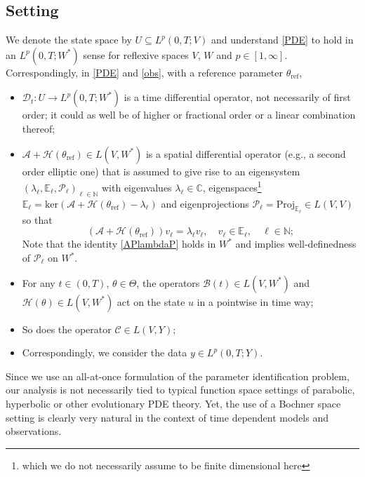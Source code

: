 \documentclass[12pt]{article}
\newcommand\DD{\mathcal{D}}
\newcommand\calA{\mathcal{A}}
\newcommand\BB{\mathcal{B}}
\newcommand\HH{\mathcal{H}}
\newcommand\Proj{\mathcal{P}}
\begin{document}
\subsection{Setting}\label{sec:setting}
We denote the state space by $U\subseteq L^p(0,T;V)$ and understand \eqref{PDE} to hold in an $L^p(0,T;W^*)$ sense for reflexive  spaces $V$, $W$ and $p\in[1,\infty]$.
Correspondingly, in \eqref{PDE} and \eqref{obs}, with a reference parameter $\theta_{\text{ref}}$,
\begin{itemize}
\item $\DD_t:U\to L^p(0,T;W^*)$ is a time differential operator, not necessarily of first order; it could as well be of higher or fractional order or a linear combination thereof; 
\item $\calA+\HH(\theta_{\text{ref}})\in L(V,W^*)$ is a spatial differential operator (e.g., a second order elliptic one) that is assumed to give rise to an eigensystem 
$(\lambda_\ell,\mathbb{E}_\ell,\Proj_\ell)_{\ell\in\mathbb{N}}$ with eigenvalues $\lambda_\ell\in\mathbb{C}$, 
eigenspaces\footnote{which we do not necessarily assume to be finite dimensional here} $\mathbb{E}_\ell=\text{ker}(\calA+\HH(\theta_{\text{ref}})-\lambda_\ell)$ and eigenprojections $\Proj_\ell=\text{Proj}_{\mathbb{E}_\ell}\in L(V,V)$ so that  
\begin{equation}\label{APlambdaP}
(\calA+\HH(\theta_{\text{ref}}))v_\ell=\lambda_\ell v_\ell, \quad v_\ell\in \mathbb{E}_\ell, \quad \ell\in\mathbb{N};
\end{equation}
Note that the identity \eqref{APlambdaP} holds in $W^*$ and implies well-definedness of $\Proj_\ell$ on $W^*$.
\item For any $t\in (0,T)$, $\theta\in\Theta$, the operators $\BB(t)\in L(V,W^*)$ and $\HH(\theta)\in L(V,W^*)$ act on the state $u$ in a pointwise in time way; 
\item So does the operator $\mathcal{C}\in L(V,Y)$; 
\item Correspondingly, we consider the data $y\in L^p(0,T;Y)$.
\end{itemize}
Since we use an all-at-once formulation of the parameter identification problem, our analysis is not necessarily tied to typical function space settings of parabolic, hyperbolic or other evolutionary PDE theory.
Yet, the use of a Bochner space setting is clearly very natural in the context of time dependent models and observations. 
\end{document}
